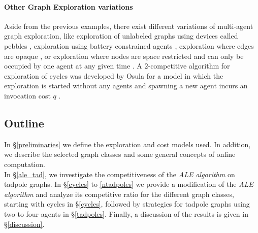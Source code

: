 \paragraph*{Other Graph Exploration variations} Aside from the previous examples, there exist different variations of multi-agent graph exploration, like exploration of unlabeled graphs using devices called pebbles \cite{Bender2002, Disser2018},
exploration using battery constrained agents \cite{Bampas2018}, exploration where edges are opaque \cite{Brass2011}, or exploration where nodes are space restricted and can only be occupied by one agent at any given time \cite{Czyzowicz2017}.
A $2$-competitive algorithm for exploration of cycles was developed by Osula for a model in which the exploration is started without any agents and spawning a new agent incurs an invocation cost $q$ \cite{Osula2017}.

\subsection{Outline}\label{outline}
In \S \ref{preliminaries} we define the exploration and cost models used. 
In addition, we describe the selected graph classes and some general concepts of online computation.\\
In \S \ref{ale_tad}, we investigate the competitiveness of the \textit{ALE algorithm} on tadpole graphs.
In \S \ref{cycles} to \ref{ntadpoles} we provide a modification of the \textit{ALE algorithm} and analyze its competitive ratio for the different graph classes, starting with cycles
in \S \ref{cycles}, followed by strategies for tadpole graphs using two to four agents in \S \ref{tadpoles}. Finally, a discussion of the results is given in \S \ref{discussion}.